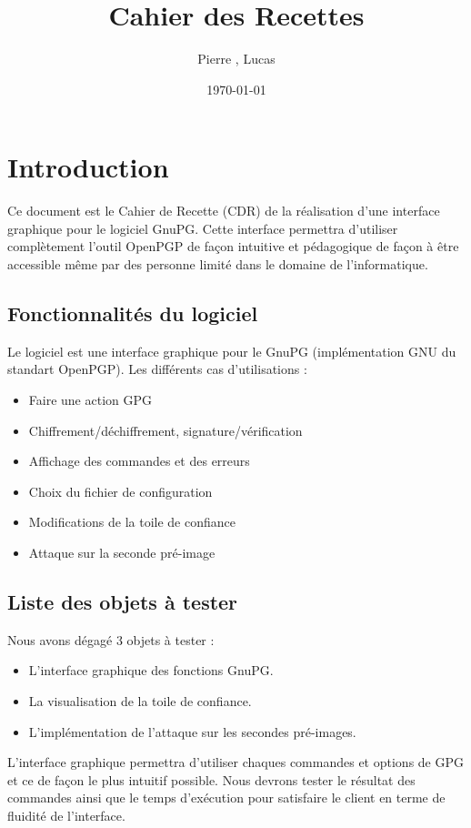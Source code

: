 \documentclass{../res/univ-projet}
\title{Cahier des Recettes}
\author{Pierre \bsc{Balmelle}, Lucas \bsc{Barbay}}
\date{\today}
\begin{document}
\maketitle
\newpage
\tableofcontents
\newpage

\section{Introduction}

Ce document est le Cahier de Recette (CDR) de la réalisation d'une interface graphique pour le logiciel GnuPG.
Cette interface permettra d'utiliser complètement l'outil OpenPGP de façon intuitive et pédagogique de façon 
à être accessible même par des personne limité dans le domaine de l'informatique. 

\subsection{Fonctionnalités du logiciel}
Le logiciel est une interface graphique pour le GnuPG (implémentation GNU du standart OpenPGP).
Les différents cas d'utilisations :
\begin{itemize}
 \item Faire une action GPG
 \item Chiffrement/déchiffrement, signature/vérification
 \item Affichage des commandes et des erreurs
 \item Choix du fichier de configuration
 \item Modifications de la toile de confiance
 \item Attaque sur la seconde pré-image
\end{itemize}

\subsection{Liste des objets à tester}
Nous avons dégagé 3 objets à tester : 
\begin{itemize}
 \item L'interface graphique des fonctions GnuPG.
 \item La visualisation de la toile de confiance.
 \item L'implémentation de l'attaque sur les secondes pré-images. 
\end{itemize}

L'interface graphique permettra d'utiliser chaques commandes et options de GPG et ce de façon le plus intuitif possible. Nous
devrons tester le résultat des commandes ainsi que le temps d'exécution pour satisfaire le client en terme de fluidité de l'interface.
\end{document}
